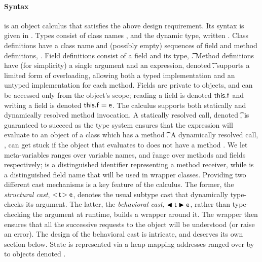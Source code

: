 \documentclass{tex/llncs}
\begin{document}
\paragraph{Syntax}  
\kafka is an object calculus that satisfies the above design
requirement. Its syntax is given in .  Types consist of class
names \C, \D and the dynamic type, written \any.  Class definitions have a
class name and (possibly empty) sequences of field and method definitions,
\Class{}. Field definitions consist of a field and its
type, \Fdef\f\t. Method definitions have (for simplicity) a single argument
and an expression, denoted \Mdef\m\x\t\t\e.  \kafka supports a limited form
of overloading, allowing both a typed implementation and an untyped
implementation for each method.  Fields are private to objects, and can be
accessed only from the object's scope; reading a field is denoted
\(\FRead\f\) and writing a field is denoted \(\FWrite\f\e \).  The calculus
supports both statically and dynamically resolved method invocation.  A
statically resolved call, denoted \KCall\e\m\ep\t\tp, is guaranteed to
succeed as the type system ensures that the expression \e will evaluate to
an object of a class which has a method \Mtype\m\t\tp. A dynamically
resolved call, \DynCall\e\m\ep, can get stuck if the object that \e
evaluates to does not have a method \Mtype\m\any\any.  We let meta-variables
\x ranges over variable names, \m and \f range over methods and fields
respectively; \this is a distinguished identifier representing a method
receiver, while \that is a distinguished field name that will be used in
wrapper classes.  Providing two different cast mechanisms is a key feature
of the calculus.  The former, the \emph{structural cast}, \(\SubCast\t\e\),
denotes the usual subtype cast that dynamically type-checks its argument.
The latter, the \emph{behavioral cast}, \(\BehCast\t\e\), rather than
type-checking the argument at runtime, builds a wrapper around it.  The
wrapper then ensures that all the successive requests to the object will be
understood (or raise an error). The design of the behavioral cast is
intricate, and deserves its own section below.  State is represented via a
heap \s mapping addresses ranged over by \a to objects
denoted \hspace{-1mm}\obj{}.
\end{document}
